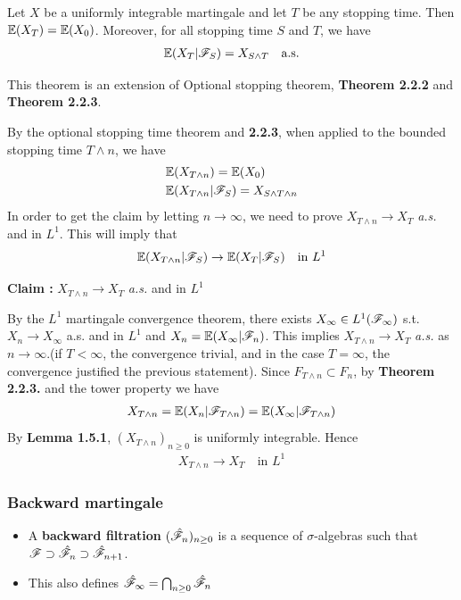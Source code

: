 \documentclass[12pt,a4paper]{report}
\newenvironment{proof}
{\begin{changemargin}{1cm}{0.5cm} 
	}%
	{\end{changemargin}
}
\newenvironment{subproof}
{\begin{changemargin}{0.5cm}{0.5cm} 
	}%
	{\end{changemargin}
}
\begin{document}
 Let $X$ be a uniformly integrable martingale and let $T$ be any stopping time. Then $\mathbb{E}(X_T) = \mathbb{E}(X_0)$. Moreover, for all stopping time $S$ and $T$, we have
\begin{align*}
\mathbb{E}(X_T |\mathscr{F}_S) = X_{S\wedge T} \quad \text{a.s.}
\end{align*}
\s

This theorem is an extension of Optional stopping theorem, \textbf{Theorem 2.2.2} and \textbf{Theorem 2.2.3}.
\begin{proof}
\pf By the optional stopping time theorem and \textbf{2.2.3}, when applied to the bounded stopping time $T\wedge n$, we have
\begin{align*}
& \mathbb{E}(X_{T\wedge n}) = \mathbb{E}(X_0) \\
& \mathbb{E}(X_{T\wedge n}|\mathscr{F}_S) = X_{S\wedge T\wedge n}
\end{align*}
In order to get the claim by letting $n\rightarrow \infty$, we need to prove $X_{T\wedge n} \rightarrow X_T$ \emph{a.s.} and in $L^1$. This will imply that
\begin{align*}
\mathbb{E}(X_{T\wedge n}|\mathscr{F}_S) \rightarrow \mathbb{E}(X_{T}|\mathscr{F}_S) \quad \text{in } L^1
\end{align*}
\begin{subproof}
\textbf{Claim :} $X_{T\wedge n} \rightarrow X_T$ \emph{a.s.} and in $L^1$

\pf By the $L^1$ martingale convergence theorem, there exists $X_{\infty} \in L^1(\mathscr{F}_{\infty})$ s.t. $X_n \rightarrow X_{\infty}$ a.s. and in $L^1$ and $X_n = \mathbb{E}(X_{\infty}|\mathscr{F}_n)$. This implies $X_{T\wedge n}\rightarrow X_T$ \emph{a.s.} as $n\rightarrow \infty$.(if $T<\infty$, the convergence trivial, and in the case $T=\infty$, the convergence justified the previous statement). Since $F_{T\wedge n} \subset F_n$, by \textbf{Theorem 2.2.3.} and the tower property we have
\begin{align*}
X_{T\wedge n} = \mathbb{E}(X_n | \mathscr{F}_{T\wedge n})= \mathbb{E}(X_{\infty}|\mathscr{F}_{T\wedge n})
\end{align*}
By \textbf{Lemma 1.5.1}, $(X_{T\wedge n})_{n\geq 0}$ is uniformly integrable. Hence
\begin{align*}
X_{T\wedge n} \rightarrow X_T \quad \text{in } L^1
\end{align*}
\end{subproof}

\eop
\end{proof}
\s

\subsubsection*{Backward martingale}
\begin{itemize}
\item A \textbf{backward filtration} $(\hat{\mathscr{F}}_n)_{n\geq 0}$ is a sequence of $\sigma$-algebras such that $\mathscr{F} \supset \hat{\mathscr{F}}_n \supset \hat{\mathscr{F}}_{n+1}$.
\item This also defines $\hat{\mathscr{F}}_{\infty} = \bigcap_{n\geq 0} \hat{\mathscr{F}}_n$
\end{itemize}
\s
\end{document}
